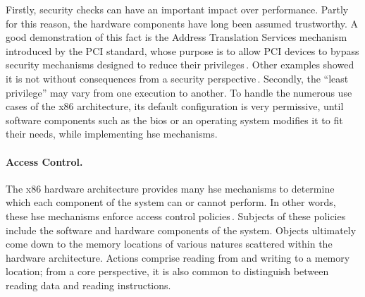 Firstly, security checks can have an important impact over performance.
%
Partly for this reason, the hardware components have long been assumed
trustworthy.
%
A good demonstration of this fact is the Address Translation Services mechanism
introduced by the PCI standard, whose purpose is to allow PCI devices to bypass
security mechanisms designed to reduce their
privileges\,\cite{daubignard2017protip}.
%
Other examples showed it is not without consequences from a security
perspective\,\cite{nohl2014badusb,hudson2015thunderstrike,chifflier2013uefi}.
%
Secondly, the ``least privilege'' may vary from one execution to another.
%
To handle the numerous use cases of the x86 architecture, its default
configuration is very permissive, until software components such as the \ac{bios} or an
operating system modifies it to fit their needs, while implementing \ac{hse}
mechanisms.


\paragraph{Access Control.}
%
The x86 hardware architecture provides many \ac{hse} mechanisms to determine
which \IO each component of the system can or cannot perform.
%
In other words, these \ac{hse} mechanisms enforce access control
policies\,\cite{sandhu1994access}.
%
Subjects of these policies include the software and hardware components of the
system.
%
Objects ultimately come down to the memory locations of various natures scattered
within the hardware architecture.
%
Actions comprise reading from and writing to a memory location; from a core
perspective, it is also common to distinguish between reading data and reading
instructions.

